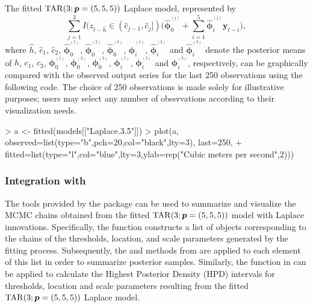 The fitted ${\rm TAR}(3;\bm{p}=(5,5,5))$ Laplace model, represented by
$$\sum\limits_{j=1}^{3} I(z_{t-\hat{h}}\in(\hat{c}_{j-1},\hat{c}_j])\!\Big(\!\hat{\bm{\phi}}_0^{^{(j)}}+\sum\limits_{i=1}^{5}\hat{\bm{\phi}}_i^{^{(j)}}\bm{y}_{t-i}\!\Big),$$
where $\hat{h}$, $\hat{c}_{1}$, $\hat{c}_{2}$, $\hat{\bm{\phi}}_0^{^{(1)}}$, $\hat{\bm{\phi}}_0^{^{(2)}}$, $\hat{\bm{\phi}}_0^{^{(3)}}$, $\hat{\bm{\phi}}_i^{^{(1)}}$, $\hat{\bm{\phi}}_i^{^{(2)}}$ and $\hat{\bm{\phi}}_i^{^{(3)}}$ denote the posterior means of ${h}$, ${c}_{1}$, ${c}_{2}$, $\bm{\phi}_0^{^{(1)}}$, $\bm{\phi}_0^{^{(2)}}$, $\bm{\phi}_0^{^{(3)}}$, ${\bm{\phi}}_i^{^{(1)}}$, ${\bm{\phi}}_i^{^{(2)}}$ and ${\bm{\phi}}_i^{^{(3)}}$, respectively, can be graphically compared with the observed output series for the last 250 observations using the following code. The choice of 250 observations is made solely for illustrative purposes; users may select any number of observations according to their visualization needs.
\begin{example}
> a <- fitted(models[["Laplace.3.5"]])
> plot(a, observed=list(type="b",pch=20,col="black",lty=3), last=250,
+         fitted=list(type="l",col="blue",lty=3,ylab=rep("Cubic meters per second",2)))
\end{example}

\subsubsection{Integration with }
The tools provided by the package  \citep{PBCV06} can be used to summarize and visualize the MCMC chains obtained from the fitted ${\rm TAR}(3;\bm{p}=(5,5,5))$ model with Laplace innovations. Specifically, the function  constructs a list of  objects corresponding to the chains of the thresholds, location, and scale parameters generated by the fitting process. Subsequently, the  and  methods from  are applied to each element of this list in order to summarize posterior samples. 
Similarly, the function  in  can be applied to calculate the Highest Posterior Density (HPD) intervals for thresholds, location and scale parameters resulting from the fitted ${\rm TAR}(3;\bm{p}=(5,5,5))$ Laplace model.

